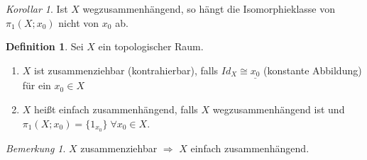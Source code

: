 \documentclass[a4paper, 12pt]{article}
\theoremstyle{plain}
\theoremstyle{definition}
\newtheorem{definition}[theorem]{Definition} %
\theoremstyle{lemma}
\theoremstyle{remark}
\newtheorem{remark}[theorem]{Bemerkung}
\theoremstyle{corollary}
\newtheorem{corollary}[theorem]{Korollar}
\theoremstyle{example}
\begin{document}
	\begin{corollary}
		Ist $X$ wegzusammenhängend, so hängt die Isomorphieklasse von $\pi_1(X;x_0)$ nicht von $x_0$ ab.
	\end{corollary}
	\begin{definition}
		Sei $X$ ein topologischer Raum. \begin{enumerate}
			\item $X$ ist zusammenziehbar (kontrahierbar), falls $Id_X \cong \underline{x_0}$ (konstante Abbildung) für ein $x_0 \in X$
			\item $X$ heißt einfach zusammenhängend, falls $X$ wegzusammenhängend ist und $\pi_1(X;x_0) = \{1_{x_0}\}\; \forall x_0 \in X$. 
		\end{enumerate}
	\end{definition}
	\begin{remark}
		$X$ zusammenziehbar $\Rightarrow$ $X$ einfach zusammenhängend.
	\end{remark}
\end{document}
